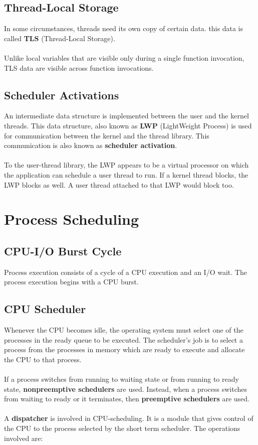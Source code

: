 \documentclass{article}
\begin{document}
\subsection{Thread-Local Storage}
In some circumstances, threads need its own copy of certain data. this data is called \textbf{TLS} (Thread-Local Storage). \\ \\
Unlike local variables that are visible only during a single function invocation, TLS data are visible across function invocations.

\subsection{Scheduler Activations}
An intermediate data structure is implemented between the user and the kernel threads. This data structure, also known as \textbf{LWP} (LightWeight Process) is used for communication between the kernel and the thread library. This communication is also known as \textbf{scheduler activation}. \\ \\
To the user-thread library, the LWP appears to be a virtual processor on which the application can schedule a user thread to run. If a kernel thread blocks, the LWP blocks as well. A user thread attached to that LWP would block too.

\section{Process Scheduling}
\subsection{CPU-I/O Burst Cycle}
Process execution consists of a cycle of a CPU execution and an I/O wait. The process execution begins with a CPU burst.

\subsection{CPU Scheduler}
Whenever the CPU becomes idle, the operating system must select one of the processes in the ready queue to be executed. The scheduler's job is to select a process from the processes in memory which are ready to execute and allocate the CPU to that process. \\ \\
If a process switches from running to waiting state or from running to ready state, \textbf{nonpreemptive schedulers} are used. Instead, when a process switches from waiting to ready or it terminates, then \textbf{preemptive schedulers} are used. \\ \\
A \textbf{dispatcher} is involved in CPU-scheduling. It is a module that gives control of the CPU to the process selected by the short term scheduler. The operations involved are:
\end{document}
